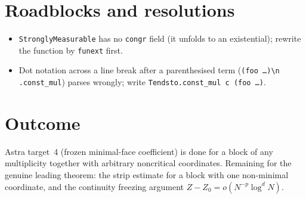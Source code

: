 \documentclass[11pt]{article}
\begin{document}
\section{Roadblocks and resolutions}
\begin{itemize}
\item \texttt{StronglyMeasurable} has no \texttt{congr} field (it unfolds to an existential); rewrite
the function by \texttt{funext} first.
\item Dot notation across a line break after a parenthesised term (\texttt{(foo …)\textbackslash n
.const\_mul}) parses wrongly; write \texttt{Tendsto.const\_mul c (foo …)}.
\end{itemize}

\section{Outcome}
Astra target~4 (frozen minimal-face coefficient) is done for a block of any multiplicity together with
arbitrary noncritical coordinates. Remaining for the genuine leading theorem: the strip estimate for a
block with one non-minimal coordinate, and the continuity freezing argument $Z-Z_0=o(N^{-p}\log^dN)$.
\end{document}
